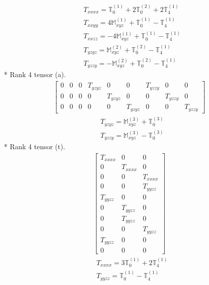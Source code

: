 \documentclass[fleqn,8pt,landscape]{jsarticle}
\begin{document}
\begin{align*}
& T_{xxxx} = \mathbb{T}_{0}^{(1)} + 2 \mathbb{T}_{0}^{(2)} + 2 \mathbb{T}_{4}^{(1)} \\
& T_{xxyy} = 4 \mathbb{M}_{xyz}^{(1)} + \mathbb{T}_{0}^{(1)} - \mathbb{T}_{4}^{(1)} \\
& T_{xxzz} = - 4 \mathbb{M}_{xyz}^{(1)} + \mathbb{T}_{0}^{(1)} - \mathbb{T}_{4}^{(1)} \\
& T_{yzyz} = \mathbb{M}_{xyz}^{(2)} + \mathbb{T}_{0}^{(2)} - \mathbb{T}_{4}^{(1)} \\
& T_{yzzy} = - \mathbb{M}_{xyz}^{(2)} + \mathbb{T}_{0}^{(2)} - \mathbb{T}_{4}^{(1)}
\end{align*}
* Rank 4 tensor (a).
\begin{align*}
\begin{bmatrix} 0 & 0 & 0 & T_{yzyz} & 0 & 0 & T_{yzzy} & 0 & 0 \\ 0 & 0 & 0 & 0 & T_{yzyz} & 0 & 0 & T_{yzzy} & 0 \\ 0 & 0 & 0 & 0 & 0 & T_{yzyz} & 0 & 0 & T_{yzzy} \end{bmatrix}
\end{align*}
\begin{align*}
& T_{yzyz} = \mathbb{M}_{xyz}^{(3)} + \mathbb{T}_{0}^{(3)} \\
& T_{yzzy} = \mathbb{M}_{xyz}^{(3)} - \mathbb{T}_{0}^{(3)}
\end{align*}
* Rank 4 tensor (t).
\begin{align*}
\begin{bmatrix} T_{xxxx} & 0 & 0 \\ 0 & T_{xxxx} & 0 \\ 0 & 0 & T_{xxxx} \\ 0 & 0 & T_{yyzz} \\ T_{yyzz} & 0 & 0 \\ 0 & T_{yyzz} & 0 \\ 0 & T_{yyzz} & 0 \\ 0 & 0 & T_{yyzz} \\ T_{yyzz} & 0 & 0 \\ 0 & 0 & 0 \end{bmatrix}
\end{align*}
\begin{align*}
& T_{xxxx} = 3 \mathbb{T}_{0}^{(1)} + 2 \mathbb{T}_{4}^{(1)} \\
& T_{yyzz} = \mathbb{T}_{0}^{(1)} - \mathbb{T}_{4}^{(1)}
\end{align*}
\end{document}
